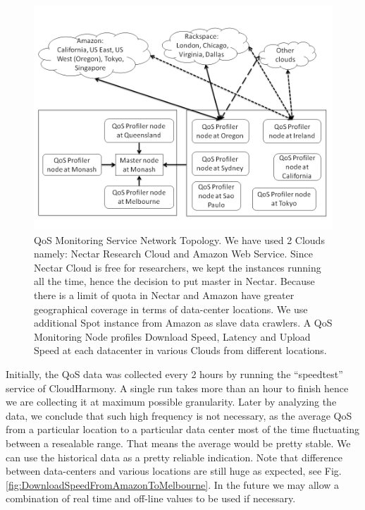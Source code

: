 \begin{figure}[!ht]
 \centering
 \includegraphics[width=\textwidth,keepaspectratio]{Figures/QoS/figure2.png}
 \caption{QoS Monitoring Service Network Topology. We have used 2 Clouds namely: Nectar Research Cloud and Amazon Web Service. Since Nectar Cloud is free for researchers, we kept the instances running all the time, hence the decision to put master in Nectar. Because there is a limit of quota in Nectar and Amazon have greater geographical coverage in terms of data-center locations. We use additional Spot instance from Amazon as slave data crawlers. A QoS Monitoring Node profiles Download Speed, Latency and Upload Speed at each datacenter in various Clouds from different locations.}
\label{fig:QoSMonitoringServiceNetworkTopology}
\end{figure}

Initially, the QoS data was collected every 2 hours by running the ``speedtest'' service of CloudHarmony. A single run takes more than an hour to finish hence we are collecting it at maximum possible granularity. Later by analyzing the data, we conclude that such high frequency is not necessary, as the average QoS from a particular location to a particular data center most of the time fluctuating between a resealable range. That means the average would be pretty stable. We can use the historical data as a pretty reliable indication. Note that difference between data-centers and various locations are still huge as expected, see Fig. \ref{fig:DownloadSpeedFromAmazonToMelbourne}. In the future we may allow a combination of real time and off-line values to be used if necessary.

